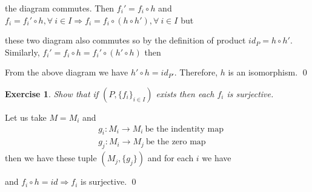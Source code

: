 \documentclass[11pt]{amsart}
\newtheorem{ex}[theorem]{Exercise}
\begin{document}
the diagram commutes. Then $f_i'=f_i\circ h$ and $f_i=f_i'\circ h,\forall~i\in I \Rightarrow f_i=f_i\circ (h\circ h'),\forall~i\in I$ but \begin{center}
\end{center}
these two diagram also commutes so by the definition of product $id_P=h\circ h'.$ Similarly, $f_i'=f_i\circ h=f_i'\circ (h'\circ h)$ then \begin{center}
\end{center}
From the above diagram we have $h'\circ h=id_{P'}.$ Therefore, $h$ is an isomorphism. \qed
\begin{ex}
Show that if $(P,\{f_i\}_{i\in I})$ exists then each $f_i$ is surjective.
\end{ex}
\proof Let us take $M=M_i$ and \begin{align*}
&g_i:M_i\to M_i~\text{be the indentity map}\\
&g_j:M_i\to M_j~\text{be the zero map}
\end{align*}
then we have these tuple $(M_j,\{g_j\})$ and for each $i$ we have \begin{center}
\end{center}
and $f_i\circ h=id \Rightarrow f_i$ is surjective. \qed
\end{document}
